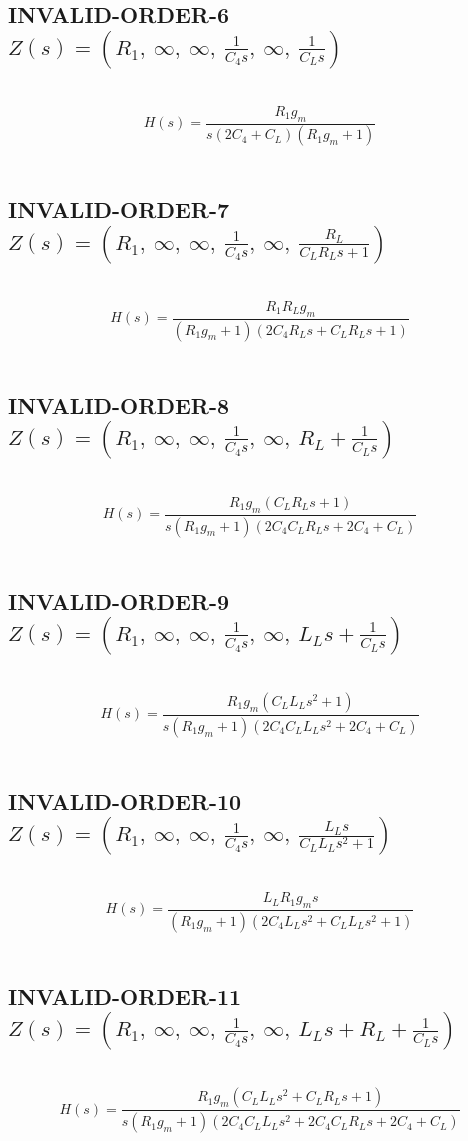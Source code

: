 \documentclass{article}
\begin{document}
\subsection{INVALID-ORDER-6 $Z(s) = \left( R_{1}, \  \infty, \  \infty, \  \frac{1}{C_{4} s}, \  \infty, \  \frac{1}{C_{L} s}\right)$ } \ 
\textbf{\[H(s) = \frac{R_{1} g_{m}}{s \left(2 C_{4} + C_{L}\right) \left(R_{1} g_{m} + 1\right)}\] } \ 
\subsection{INVALID-ORDER-7 $Z(s) = \left( R_{1}, \  \infty, \  \infty, \  \frac{1}{C_{4} s}, \  \infty, \  \frac{R_{L}}{C_{L} R_{L} s + 1}\right)$ } \ 
\textbf{\[H(s) = \frac{R_{1} R_{L} g_{m}}{\left(R_{1} g_{m} + 1\right) \left(2 C_{4} R_{L} s + C_{L} R_{L} s + 1\right)}\] } \ 
\subsection{INVALID-ORDER-8 $Z(s) = \left( R_{1}, \  \infty, \  \infty, \  \frac{1}{C_{4} s}, \  \infty, \  R_{L} + \frac{1}{C_{L} s}\right)$ } \ 
\textbf{\[H(s) = \frac{R_{1} g_{m} \left(C_{L} R_{L} s + 1\right)}{s \left(R_{1} g_{m} + 1\right) \left(2 C_{4} C_{L} R_{L} s + 2 C_{4} + C_{L}\right)}\] } \ 
\subsection{INVALID-ORDER-9 $Z(s) = \left( R_{1}, \  \infty, \  \infty, \  \frac{1}{C_{4} s}, \  \infty, \  L_{L} s + \frac{1}{C_{L} s}\right)$ } \ 
\textbf{\[H(s) = \frac{R_{1} g_{m} \left(C_{L} L_{L} s^{2} + 1\right)}{s \left(R_{1} g_{m} + 1\right) \left(2 C_{4} C_{L} L_{L} s^{2} + 2 C_{4} + C_{L}\right)}\] } \ 
\subsection{INVALID-ORDER-10 $Z(s) = \left( R_{1}, \  \infty, \  \infty, \  \frac{1}{C_{4} s}, \  \infty, \  \frac{L_{L} s}{C_{L} L_{L} s^{2} + 1}\right)$ } \ 
\textbf{\[H(s) = \frac{L_{L} R_{1} g_{m} s}{\left(R_{1} g_{m} + 1\right) \left(2 C_{4} L_{L} s^{2} + C_{L} L_{L} s^{2} + 1\right)}\] } \ 
\subsection{INVALID-ORDER-11 $Z(s) = \left( R_{1}, \  \infty, \  \infty, \  \frac{1}{C_{4} s}, \  \infty, \  L_{L} s + R_{L} + \frac{1}{C_{L} s}\right)$ } \ 
\textbf{\[H(s) = \frac{R_{1} g_{m} \left(C_{L} L_{L} s^{2} + C_{L} R_{L} s + 1\right)}{s \left(R_{1} g_{m} + 1\right) \left(2 C_{4} C_{L} L_{L} s^{2} + 2 C_{4} C_{L} R_{L} s + 2 C_{4} + C_{L}\right)}\] } \ 
\end{document}
